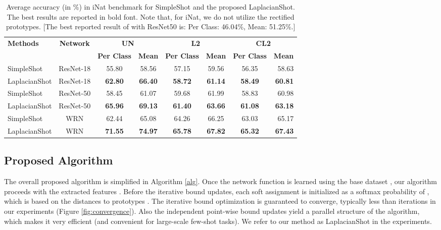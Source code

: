\documentclass{article}
\begin{document}
\begin{table*}[tb]
\caption{Average accuracy (in \%) in iNat benchmark for SimpleShot \cite{wang2019simpleshot} and the proposed LaplacianShot. The best results are reported in bold font. Note that, for iNat, we do not utilize the rectified prototypes. [The best reported result of \cite{wertheimer2019few} with ResNet50 is: Per Class: 46.04\%, Mean: 51.25\%.]}
\label{tab:iNat}
\vskip 0.1in
\begin{center}
\begin{small}
\begin{tabular}{lccccccr}
\toprule
\multirow{2}{*}{\textbf{Methods}} & \multirow{2}{*}{\textbf{Network}} & \multicolumn{2}{c}{\textbf{UN}}& \multicolumn{2}{c}{\textbf{L2}}&\multicolumn{2}{c}{\textbf{CL2}}\\
&&\textbf{Per Class}&\textbf{Mean}&\textbf{Per Class}&\textbf{Mean}&\textbf{Per Class}&\textbf{Mean}\\
\midrule
SimpleShot & ResNet-18 &55.80&58.56&57.15& 59.56 & 56.35& 58.63\\
\rowcolor{Gray}
LaplacianShot & ResNet-18 &\textbf{62.80}&\textbf{66.40}&\textbf{58.72}&\textbf{61.14}&\textbf{58.49}&\textbf{60.81}\\
\hline
SimpleShot & ResNet-50 &58.45&61.07&59.68&61.99&58.83&60.98\\
\rowcolor{Gray}
LaplacianShot & ResNet-50 &\textbf{65.96}&\textbf{69.13}&\textbf{61.40}&\textbf{63.66}&\textbf{61.08}&\textbf{63.18}\\
\hline
SimpleShot & WRN &62.44&65.08&64.26&66.25&63.03&65.17\\
\rowcolor{Gray}
LaplacianShot &WRN &\textbf{71.55} & \textbf{74.97}& \textbf{65.78}& \textbf{67.82}&\textbf{65.32} &\textbf{67.43}\\
\bottomrule
\end{tabular}
\end{small}
\end{center}
\vskip -0.1in
\end{table*}
\subsection{Proposed Algorithm}
The overall proposed algorithm is simplified in Algorithm \ref{alg}. Once the network function  is learned using the base dataset , our algorithm proceeds with the extracted features . Before the iterative bound updates, each 
soft assignment  is initialized as a softmax probability of , which is based on the distances to prototypes . The iterative bound optimization is guaranteed to converge, typically less than  iterations in our experiments (Figure \ref{fig:convergence}). Also the independent point-wise bound updates yield a parallel structure of the algorithm, which makes it very efficient (and convenient for large-scale few-shot tasks). We refer to our method as 
LaplacianShot in the experiments.
\end{document}
